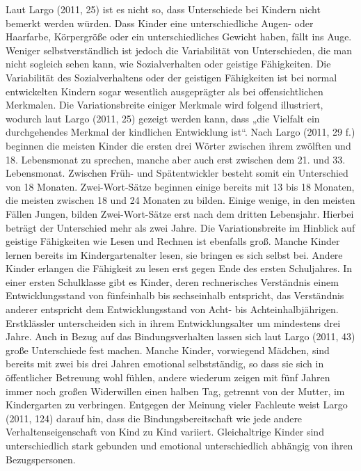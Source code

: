 Laut Largo (2011, 25) ist es nicht so, dass Unterschiede bei Kindern nicht bemerkt werden würden. Dass Kinder eine unterschiedliche Augen- oder Haarfarbe, Körpergröße oder ein unterschiedliches Gewicht haben, fällt ins Auge. Weniger selbstverständlich ist jedoch die Variabilität von Unterschieden, die man nicht sogleich sehen kann, wie Sozialverhalten oder geistige Fähigkeiten. Die Variabilität des Sozialverhaltens oder der geistigen Fähigkeiten ist bei normal entwickelten Kindern sogar wesentlich ausgeprägter als bei offensichtlichen Merkmalen. Die Variationsbreite einiger Merkmale wird folgend illustriert, wodurch laut Largo (2011, 25) gezeigt werden kann, dass „die Vielfalt ein durchgehendes Merkmal der kindlichen Entwicklung ist“. Nach Largo (2011, 29 f.) beginnen die meisten Kinder die ersten drei Wörter zwischen ihrem zwölften und 18. Lebensmonat zu sprechen, manche aber auch erst zwischen dem 21. und 33. Lebensmonat. Zwischen Früh- und Spätentwickler besteht somit ein Unterschied von 18 Monaten. Zwei-Wort-Sätze beginnen einige bereits mit 13 bis 18 Monaten, die meisten zwischen 18 und 24 Monaten zu bilden. Einige wenige, in den meisten Fällen Jungen, bilden Zwei-Wort-Sätze erst nach dem dritten Lebensjahr. Hierbei beträgt der Unterschied mehr als zwei Jahre. Die Variationsbreite im Hinblick auf geistige Fähigkeiten wie Lesen und Rechnen ist ebenfalls groß. Manche Kinder lernen bereits im Kindergartenalter lesen, sie bringen es sich selbst bei. Andere Kinder erlangen die Fähigkeit zu lesen erst gegen Ende des ersten Schuljahres. In einer ersten Schulklasse gibt es Kinder, deren rechnerisches Verständnis einem Entwicklungsstand von fünfeinhalb bis sechseinhalb entspricht, das Verständnis anderer entspricht dem Entwicklungsstand von Acht- bis Achteinhalbjährigen. Erstklässler unterscheiden sich in ihrem Entwicklungsalter um mindestens drei Jahre. Auch in Bezug auf das Bindungsverhalten lassen sich laut Largo (2011, 43) große Unterschiede fest machen. Manche Kinder, vorwiegend Mädchen, sind bereits mit zwei bis drei Jahren emotional selbstständig, so dass sie sich in öffentlicher Betreuung wohl fühlen, andere wiederum zeigen mit fünf Jahren immer noch großen Widerwillen einen halben Tag, getrennt von der Mutter, im Kindergarten zu verbringen. Entgegen der Meinung vieler Fachleute weist Largo (2011, 124) darauf hin, dass die Bindungsbereitschaft wie jede andere Verhaltenseigenschaft von Kind zu Kind variiert. Gleichaltrige Kinder sind unterschiedlich stark gebunden und emotional unterschiedlich abhängig von ihren Bezugspersonen. 

